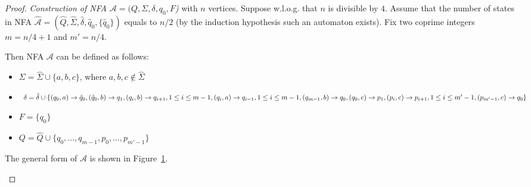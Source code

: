 \documentclass[11pt,a4paper]{article} %
\begin{document}
\begin{proof}
\textit{Construction of NFA $\mathcal{A} = (Q,\Sigma ,\delta ,q_{0},F$)} with $n$ vertices. 
Suppose w.l.o.g. that $n$ is divisible by $4$.
Assume that the number of states in NFA $\hat{\mathcal{A}}= (\hat{Q},\hat{\Sigma},\hat{\delta} ,\hat{q}_{0},\{\hat{q}_{0}\})$ equals to $n/2$ (by the induction hypothesis such an automaton exists). Fix two coprime integers $m=n/4 + 1$ and $m' = n/4$.

Then NFA $\mathcal{A}$ can be defined as follows:
\begin{itemize}
\item $\Sigma = \hat{\Sigma} \cup \{a, b, c\}$, where $a, b, c \not\in  \hat{\Sigma}$
\item $\delta = \hat{\delta} \cup \{
\\(q_{0}, a) \rightarrow \hat{q}_{0},
\\(\hat{q}_{0}, b) \rightarrow q_{1},
\\(q_{i}, b) \rightarrow q_{i+1}, 1 \le i \le m-1,
\\(q_{i}, a) \rightarrow q_{i-1}, 1 \le i \le m-1,
\\(q_{m-1}, b) \rightarrow q_{0},
\\(q_{0}, c) \rightarrow p_{1},
\\(p_{i}, c) \rightarrow p_{i+1}, 1 \le i \le m'-1,
\\(p_{m'-1}, c) \rightarrow q_{0}\}$
\item $F = \{q_{0}\}$
\item $Q = \hat{Q} \cup \{ q_{0}, ..., q_{m-1}, p_{0}, ..., p_{m'-1}\}$
\end{itemize}
The general form of $\mathcal{A}$ is shown in Figure~\ref{dimautomata:generalized}.

\begin{figure}[h]
\centering
  \begin{minipage}[m]{0.75\linewidth}
  \end{minipage}\hfill
  \label{dimautomata:generalized}
\end{figure}


\end{proof}
\end{document}
